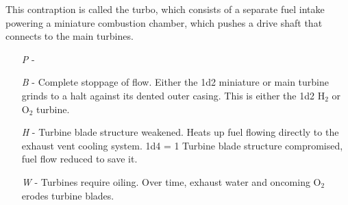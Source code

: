 \documentclass[a4paper]{article}
\begin{document}
This contraption is called the turbo, which consists of a separate fuel intake powering a miniature combustion chamber, which pushes a drive shaft that connects to the main turbines.
\begin{enumerate}
\item [\textit{P}] -  
\item [\textit{B}] -  Complete stoppage of flow. Either the 1d2 miniature or main turbine grinds to a halt against its dented outer casing. This is either the 1d2 H$_2$ or O$_2$ turbine.
\item [\textit{H}] - Turbine blade structure weakened. Heats up fuel flowing directly to the exhaust vent cooling system. \newline \hspace{3pt} 1d4 = 1 Turbine blade structure compromised, fuel flow reduced to save it.
\item [\textit{W}] - Turbines require oiling. Over time, exhaust water and oncoming O$_2$ erodes turbine blades. 
\end{enumerate}
\end{document}
